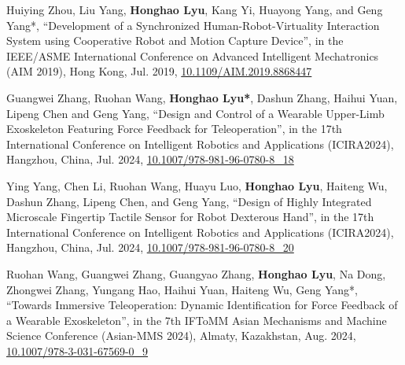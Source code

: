 \begin{enumerate}[align=left, widest={[\textbf{S.1}]}, itemindent=0em, label={\textbf{[\arabic*]}]
    \item[\textbf{[C.4]}] Huiying Zhou, Liu Yang, \textbf{Honghao Lyu}, Kang Yi, Huayong Yang, and Geng Yang*, ``Development of a Synchronized Human-Robot-Virtuality Interaction System using Cooperative Robot and Motion Capture Device'', in the IEEE/ASME International Conference on Advanced Intelligent Mechatronics (AIM 2019), Hong Kong, Jul. 2019, \href{https://doi.org/10.1109/AIM.2019.8868447}{10.1109/AIM.2019.8868447}
    \item[\textbf{[C.3]}] Guangwei Zhang, Ruohan Wang, \textbf{Honghao Lyu*}, Dashun Zhang, Haihui Yuan, Lipeng Chen and Geng Yang, ``Design and Control of a Wearable Upper-Limb Exoskeleton Featuring Force Feedback for Teleoperation'', in the 17th International Conference on Intelligent Robotics and Applications (ICIRA2024), Hangzhou, China, Jul. 2024, \href{https://doi.org/10.1007/978-981-96-0780-8_18}{10.1007/978-981-96-0780-8\_18}
    \item[\textbf{[C.2]}] Ying Yang, Chen Li, Ruohan Wang, Huayu Luo, \textbf{Honghao Lyu}, Haiteng Wu, Dashun Zhang, Lipeng Chen, and Geng Yang, ``Design of Highly Integrated Microscale Fingertip Tactile Sensor for Robot Dexterous Hand'', in the 17th International Conference on Intelligent Robotics and Applications (ICIRA2024), Hangzhou, China, Jul. 2024, \href{https://doi.org/10.1007/978-981-96-0780-8_20}{10.1007/978-981-96-0780-8\_20}
    \item[\textbf{[C.1]}] Ruohan Wang, Guangwei Zhang, Guangyao Zhang, \textbf{Honghao Lyu}, Na Dong, Zhongwei Zhang, Yungang Hao, Haihui Yuan, Haiteng Wu, Geng Yang*, ``Towards Immersive Teleoperation: Dynamic Identification for Force Feedback of a Wearable Exoskeleton'', in the 7th IFToMM Asian Mechanisms and Machine Science Conference (Asian-MMS 2024), Almaty, Kazakhstan, Aug. 2024, \href{https://doi.org/10.1007/978-3-031-67569-0_9}{10.1007/978-3-031-67569-0\_9}
\end{enumerate}
\resumeItemListEnd
